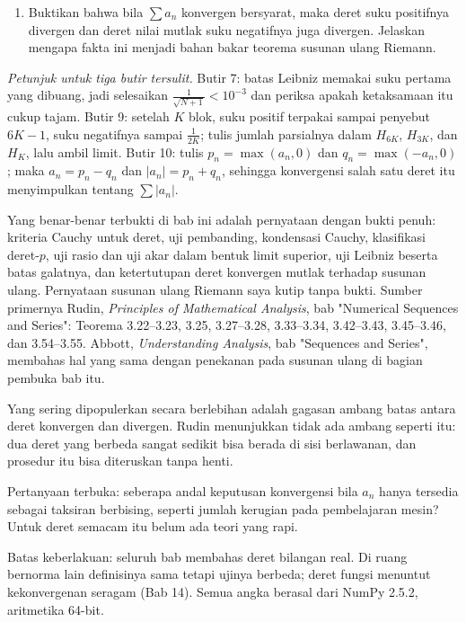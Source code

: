 \begin{latihan}
\begin{enumerate}
\item Buktikan bahwa bila $\sum a_n$ konvergen bersyarat, maka deret suku
      positifnya divergen dan deret nilai mutlak suku negatifnya juga divergen.
      Jelaskan mengapa fakta ini menjadi bahan bakar teorema susunan ulang Riemann.
\end{enumerate}

\noindent\emph{Petunjuk untuk tiga butir tersulit.} Butir 7: batas Leibniz memakai
suku pertama yang dibuang, jadi selesaikan $\frac{1}{\sqrt{N+1}} < 10^{-3}$ dan
periksa apakah ketaksamaan itu cukup tajam. Butir 9: setelah $K$ blok, suku positif
terpakai sampai penyebut $6K-1$, suku negatifnya sampai $\frac{1}{2K}$; tulis jumlah
parsialnya dalam $H_{6K}$, $H_{3K}$, dan $H_{K}$, lalu ambil limit. Butir 10: tulis
$p_n = \max(a_n, 0)$ dan $q_n = \max(-a_n, 0)$; maka $a_n = p_n - q_n$ dan
$|a_n| = p_n + q_n$, sehingga konvergensi salah satu deret itu menyimpulkan tentang
$\sum |a_n|$.
\end{latihan}

\begin{untukpeneliti}
Yang benar-benar terbukti di bab ini adalah pernyataan dengan bukti penuh: kriteria
Cauchy untuk deret, uji pembanding, kondensasi Cauchy, klasifikasi deret-$p$, uji rasio
dan uji akar dalam bentuk limit superior, uji Leibniz beserta batas galatnya, dan
ketertutupan deret konvergen mutlak terhadap susunan ulang. Pernyataan susunan ulang
Riemann saya kutip tanpa bukti. Sumber primernya Rudin, \emph{Principles of Mathematical
Analysis}, bab "Numerical Sequences and Series": Teorema 3.22--3.23, 3.25, 3.27--3.28,
3.33--3.34, 3.42--3.43, 3.45--3.46, dan 3.54--3.55. Abbott, \emph{Understanding
Analysis}, bab "Sequences and Series", membahas hal yang sama dengan penekanan pada
susunan ulang di bagian pembuka bab itu.

Yang sering dipopulerkan secara berlebihan adalah gagasan ambang batas antara deret
konvergen dan divergen. Rudin menunjukkan tidak ada ambang seperti itu: dua deret yang
berbeda sangat sedikit bisa berada di sisi berlawanan, dan prosedur itu bisa diteruskan
tanpa henti.

Pertanyaan terbuka: seberapa andal keputusan konvergensi bila $a_n$ hanya tersedia
sebagai taksiran berbising, seperti jumlah kerugian pada pembelajaran mesin? Untuk
deret semacam itu belum ada teori yang rapi.

Batas keberlakuan: seluruh bab membahas deret bilangan real. Di ruang bernorma lain
definisinya sama tetapi ujinya berbeda; deret fungsi menuntut kekonvergenan seragam
(Bab 14). Semua angka berasal dari NumPy 2.5.2, aritmetika 64-bit.
\end{untukpeneliti}

